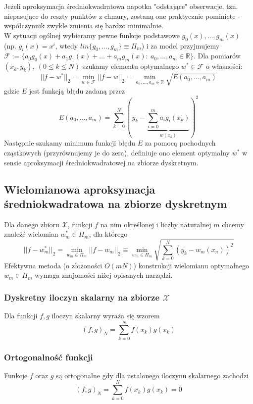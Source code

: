 \documentclass[a4paper,11pt]{article}
\begin{document}
\noindent Jeżeli aproksymacja średniokwadratowa napotka "odstające" obserwacje, tzn. niepasujące do reszty punktów z chmury, zostaną one praktycznie pominięte - współczynnik zwykle zmienia się bardzo minimalnie.\\
W sytuacji ogólnej wybieramy pewne funkcje podstawowe $g_0(x), \ldots, g_m(x)$ (np. $g_i(x)=x^i$, wtedy $lin\{g_0, \ldots, g_m\} \equiv \Pi_m$) i za model przyjmujemy $\mathcal{F} := \{ a_0g_0(x)+a_1g_1(x)+\ldots+a_mg_m(x): \ a_0, \ldots, a_m \in \mathbb{R}  \}$. Dla pomiarów $(x_k, y_k), \ (0\leq k \leq N)$ szukamy elementu optymalnego $w^*\in\mathcal{F}$ o własności:
$$ ||f-w^*||_2 = \min\limits_{w\in\mathcal{F}}^{} ||f-w||_2  = \min\limits_{a_0, \ldots, a_m \in \mathbb{R}}^{} \sqrt{E(a_0, \ldots, a_m)}$$
gdzie $E$ jest funkcją błędu zadaną przez 
$$E(a_0, \ldots, a_m) = \sum\limits_{k=0}^{N} \left( y_k - \underbrace{\sum\limits_{i=0}^{m} a_ig_i(x_k)}_{w(x_k)}  \right)^2 $$
Następnie szukamy minimum funkcji błędu $E$ za pomocą pochodnych cząstkowych (przyrównujemy je do zera), definiuje ono element optymalny $w^*$ w sensie aproksymacji średniokwadratowej na zbiorze dyskretnym.

\subsection{Wielomianowa aproksymacja średniokwadratowa na zbiorze dyskretnym}
Dla danego zbioru $\mathcal{X}$, funkcji $f$ na nim określonej i liczby naturalnej $m$ chcemy znaleźć wielomian $w_m^*\in\Pi_m$, dla którego
$$  ||f-w_m^*||_2 = \min\limits_{w_m\in\Pi_m}^{} ||f-w_m||_2 \equiv \min\limits_{w_m\in\Pi_m}^{} \sqrt{\sum\limits_{k=0}^{N} \left( y_k - w_m(x_n) \right)^{2}}$$
Efektywna metoda (o złożoności $O(mN)$) konstrukcji wielomianu optymalnego $w_m\in\Pi_m$ wymaga znajomości niżej opisanych narzędzi.

\subsubsection{Dyskretny iloczyn skalarny na zbiorze $\mathcal{X}$}
Dla funkcji $f,g$ iloczyn skalarny wyraża się wzorem
$$ (f,g)_N = \sum\limits_{k=0}^{N} f(x_k)g(x_k)$$

\subsubsection{Ortogonalność funkcji}
Funkcje $f$ oraz $g$ są ortogonalne gdy dla ustalonego iloczynu skalarnego zachodzi
$$ (f,g)_N = \sum\limits_{k=0}^{N} f(x_k)g(x_k) = 0$$
\end{document}
